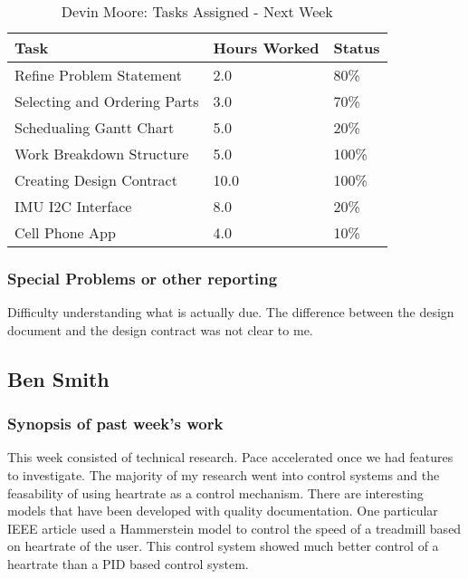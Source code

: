 \documentclass[12pt,article,compsoc]{IEEEtran}
\begin{document}
	\begin{table}[ht]
	\renewcommand{\arraystretch}{1.3}
		\caption{Devin Moore: Tasks Assigned - Next Week}
		
		\label{Summary of Devin Moore's activites: this week}
		
		\centering
		\begin{tabular}{p{5.5cm}|p{1cm}|p{1cm}}

		\hline
		\bfseries 	Task		 		            & \bfseries Hours Worked	& \bfseries Status	\\
		\hline\hline
			    	Refine Problem Statement    	& 2.0						& 80\%				\\
                    Selecting and Ordering Parts    & 3.0                       & 70\%              \\
					Schedualing Gantt Chart	        & 5.0						& 20\%				\\
                    Work Breakdown Structure        & 5.0                       & 100\%             \\
                    Creating Design Contract        & 10.0                      & 100\%             \\
                    IMU I2C Interface               & 8.0                       & 20\%              \\
                    Cell Phone App                  & 4.0                       & 10\%              \\
                    \hline
		\end{tabular}
	\end{table}

	\subsubsection*{Special Problems or other reporting}
	Difficulty understanding what is actually due. The difference between the design document and the design
    contract was not clear to me.
\subsection{Ben Smith}

	\subsubsection*{Synopsis of past week's work}
	This week consisted of technical research. Pace accelerated once we had features to investigate.
	The majority of my research went into control systems and the feasability of using heartrate as a
    control mechanism. There are interesting models that have been developed with quality documentation.
    One particular IEEE article used a Hammerstein model to control the speed of a treadmill based on
    heartrate of the user. This control system showed much better control of a heartrate than a PID
    based control system.
\end{document}
